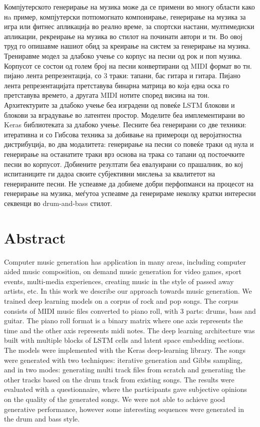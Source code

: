 Компјутерското генерирање на музика може да се примени во многу области како нa пример, компјутерски потпомогнато компонирање, генерирање на музика за игра или фитнес апликација во реално време, за спортски настани, мултимедиски апликации, рекреирање на музика во стилот на починати автори и тн. Во овој труд го опишавме нашиот обид за креирање на систем за генерирање на музика. Трениравме модел за длабоко учење со корпус на песни од рок и поп музика. Корпусот се состои од голем број на песни конвертирани од MIDI формат во тн. пијано лента репрезентација, со 3 траки: тапани, бас гитара и гитара. Пијано лента репрезентацијата претставува бинарна матрица во која една оска го претставува времето, а другата MIDI нотите според висина на тон. 
Архитектурите за длабоко учење беа изградени од повеќе LSTM блокови и блокови за вградување во латентен простор. Моделите беа имплементирани во Keras библиотеката за длабоко учење. 
Песните беа генерирани со две техники: итеративна и со Гибсова техника за добивање на примероци од веројатностна дистрибуција, во два модалитета: генерирање на песни со повеќе траки од нула и генерирање на останатите траки врз основа на трака со тапани од постоечките песни во корпусот.
Добиените резултати беа евалуирани со прашалник, во кој испитаниците ги дадоа своите субјективни мислења за квалитетот на генерираните песни. Не успеавме да добиеме добри перфопманси на процесот на генерирање на музика, меѓутоа успеавме да генерираме неколку кратки интересни секвенци во drum-and-bass стилот.

\chapter*{Abstract}

Computer music generation has application in many areas, including computer aided music composition, on demand music generation for video games, sport events, multi-media experiences, creating music in the style of passed away artists, etc.
In this work we describe our approach towards music generation. We trained deep learning models on a corpus of rock and pop songs.
The corpus consists of MIDI music files converted to piano roll, with 3 parts: drums, bass and guitar. The piano roll format is a binary matrix where one axis represents the time and the other axis represents midi notes.
The deep learning architecture was built with multiple blocks of LSTM cells and latent space embedding sections. The models were implemented with the Keras deep-learning library. The songs were generated with two techniques: iterative generation and Gibbs sampling, and in two modes: generating multi track files from scratch and generating the other tracks based on the drum track from existing songs.
The results were evaluated with a questionnaire, where the participants gave subjective opinions on the quality of the generated songs. We were not able to achieve good generative performance, however some interesting sequences were generated in the drum and bass style.

